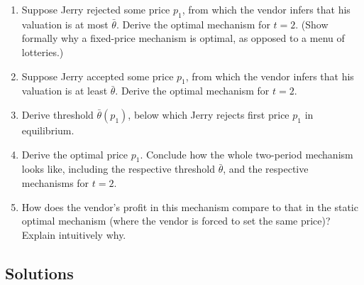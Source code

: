 \documentclass[a4paper]{article}
\newif\ifsolutions
\begin{document}
\begin{enumerate}
	\item Suppose Jerry rejected some price $p_1$, from which the vendor infers that his valuation is at most $\bar{\theta}$. Derive the optimal mechanism for $t=2$. (Show formally why a fixed-price mechanism is optimal, as opposed to a menu of lotteries.)
	
	\item Suppose Jerry accepted some price $p_1$, from which the vendor infers that his valuation is at least $\bar{\theta}$. Derive the optimal mechanism for $t=2$.
	
	\item Derive threshold $\bar{\theta}(p_1)$, below which Jerry rejects first price $p_1$ in equilibrium.
	
	\item Derive the optimal price $p_1$. Conclude how the whole two-period mechanism looks like, including the respective threshold $\bar{\theta}$, and the respective mechanisms for $t=2$.
	
	\item How does the vendor's profit in this mechanism compare to that in the static optimal mechanism (where the vendor is forced to set the same price)? Explain intuitively why.
\end{enumerate}

\ifsolutions
\subsection*{Solutions}
\end{document}
